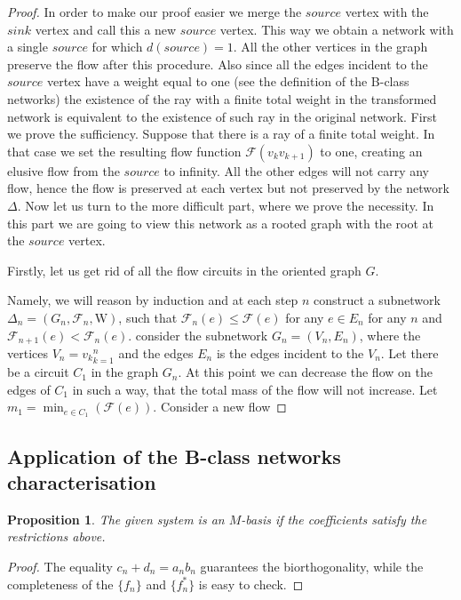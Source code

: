 \documentclass[12pt]{article}
\renewcommand{\leq}{\leqslant}
\newtheorem{prop}{Proposition}
\theoremstyle{definition}
\newcommand{\wt}{\mathrm{W}}
\newcommand{\flow}{\mathcal{F}}
\newcommand{\source}{\mathit{source}}
\newcommand{\sink}{\mathit{sink}}
\newcommand{\net}{\Delta}
\numberwithin{remark}{section}
\numberwithin{theorem}{section}
\numberwithin{prop}{section}
\numberwithin{equation}{section}
\numberwithin{lemma}{section}
\numberwithin{prop_under_lemma}{lemma}
\begin{document}
    \begin{proof}
      In order to make our proof easier we merge the $\source$ vertex with the $\sink$ vertex and call this a
      new $\source$ vertex.
      This way we obtain a network with a single $\source$ for which $d(\source) = 1$.
      All the other vertices in the graph preserve the flow after this procedure.
      Also since all the edges incident to the $\source$ vertex have a weight equal to one
      (see the definition of the B-class networks) the existence of the ray with a finite total weight
      in the transformed network is equivalent to the existence of such ray in the original network.
      First we prove the sufficiency.
      Suppose that there is a ray of a finite total weight. 
      In that case we set the resulting flow function $\flow(v_k v_{k+1})$ to one, creating an elusive flow
      from the $\source$ to infinity. All the other edges will not carry any flow, hence the flow is preserved
      at each vertex but not preserved by the network $\net$.
      Now let us turn to the more difficult part, where we prove the necessity.
      In this part we are going to view this network as a rooted graph with the root at the $\source$ vertex.

      Firstly, let us get rid of all the flow circuits in the oriented graph $G$.

      Namely, we will reason by induction and at each step $n$ construct a subnetwork
      $\net_n = (G_n, \flow_n, \wt)$, such that $\flow_n(e) \leq \flow(e)$ for any $e \in E_n$ for any $n$
      and $\flow_{n+1}(e) < \flow_n(e)$.
      consider the subnetwork $G_n = (V_n, E_n)$, where the vertices
      $V_n = {v_k}_{k=1}^n$ and the edges $E_n$ is the edges incident to the $V_n$.
      Let there be a circuit $C_1$ in the graph $G_n$.
      At this point we can decrease the flow on the edges of $C_1$ in such a way, that the total mass
      of the flow will not increase.
      Let $m_1 = \min_{e \in C_1}(\flow(e))$.
      Consider a new flow

    \end{proof}
    \subsection{Application of the B-class networks characterisation}
    \pagebreak
    \begin{prop}
        The given system is an $M$-basis if the coefficients satisfy the restrictions above.
    \end{prop}
    \begin{proof}
        The equality $c_n + d_n = a_n b_n$ guarantees the bi\-orthogonality,
        while the completeness of the $\{f_n\}$ and $\{f_n^*\}$ is
        easy to check.
    \end{proof}
    
\end{document}
